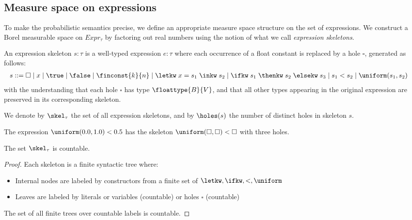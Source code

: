 \subsection{Measure space on expressions}
To make the probabilistic semantics precise, we define an appropriate measure space structure on the set of expressions. We construct a Borel measurable space on $Expr_{\tau}$ by factoring out real numbers using the notion of what we call \emph{expression skeletons}.

\begin{definition}
	An expression skeleton $s : \tau$ is a well-typed expression $e : \tau$ where each occurrence of a float constant is replaced by a hole $\square$, generated as follows:
	\begin{align*}
		s ::= \; 
		&\square \mid x \mid \true \mid \false \mid \finconst{k}{n} \mid \letkw \; x = s_1 \; \inkw \; s_2 \mid \ifkw \; s_1 \; \thenkw \; s_2 \; \elsekw \; s_3 \mid s_1 < s_2 \mid \uniform(s_1, s_2)
	\end{align*}
	with the understanding that each hole $\square$ has type $\floattype{B}{V}$, and that all other types appearing in the original expression are preserved in its corresponding skeleton.
	
	We denote by $\skel_{\tau}$ the set of all expression skeletons, and by $\holes(s)$ the number of distinct holes in skeleton $s$.
\end{definition}

\begin{example}
	The expression $\uniform(0.0, 1.0) < 0.5$ has the skeleton $\uniform(\square, \square) < \square$ with three holes. 
\end{example}

\begin{lemma}\label{lem:skel-countable}
	The set $\skel_{\tau}$ is countable.
\end{lemma}

\begin{proof}
	Each skeleton is a finite syntactic tree where:
	\begin{itemize}
	\item Internal nodes are labeled by constructors from a finite set of ${\letkw, \ifkw, <, \uniform}$
	\item Leaves are labeled by literals or variables (countable) or holes $\square$ (countable)
	\end{itemize}
	The set of all finite trees over countable labels is countable.
\end{proof}

